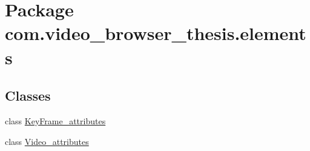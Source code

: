 \hypertarget{namespacecom_1_1video__browser__thesis_1_1elements}{\section{Package com.\-video\-\_\-browser\-\_\-thesis.\-elements}
\label{namespacecom_1_1video__browser__thesis_1_1elements}
}
\subsection*{Classes}
\begin{DoxyCompactItemize}
\item 
class \hyperlink{classcom_1_1video__browser__thesis_1_1elements_1_1_key_frame__attributes}{Key\-Frame\-\_\-attributes}
\item 
class \hyperlink{classcom_1_1video__browser__thesis_1_1elements_1_1_video__attributes}{Video\-\_\-attributes}
\end{DoxyCompactItemize}
